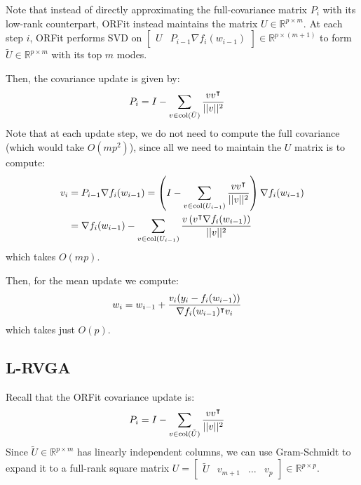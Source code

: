 Note that instead of directly approximating the full-covariance matrix $P_i$ with
its low-rank counterpart, ORFit instead maintains the matrix $U \in \mathbb{R}^{p \times m}$. At each step $i$,
ORFit performs SVD on $\begin{bmatrix} U & P_{i-1} \nabla f_i(w_{i-1}) \end{bmatrix} \in \mathbb{R}^{p \times (m+1)}$
to form $\tilde{U} \in \mathbb{R}^{p \times m}$ with its top $m$ modes.

Then, the covariance update is given by:
\begin{align}
    P_i &= I - \sum_{v \in \text{col}(\tilde{U})} \frac{v v^{\intercal}}{||v||^2}
\end{align}
Note that at each update step, we do not need to compute the full covariance 
(which would take $O(mp^2)$), since all we need to maintain the $U$ matrix is to compute:
\begin{align}
    v_i &= P_{i-1} \nabla f_i(w_{i-1}) = \left( I - \sum_{v \in \text{col}(U_{i-1})} \frac{v v^{\intercal}}{||v||^2} \right) \nabla f_i(w_{i-1}) \\
    &= \nabla f_i(w_{i-1}) - \sum_{v \in \text{col}(U_{i-1})} \frac{v \left(v^{\intercal}\nabla f_i(w_{i-1})\right)}{||v||^2}
\end{align}
which takes $O(mp)$.

Then, for the mean update we compute:
\begin{align}
    w_i &= w_{i-1} + \frac{v_i (y_i - f_i(w_{i-1}))}{\nabla f_i(w_{i-1})^{\intercal} v_i}
\end{align}
which takes just $O(p)$.

\subsection{L-RVGA}
Recall that the ORFit covariance update is:
\begin{align}
    P_i &= I - \sum_{v \in \text{col}(\tilde{U})} \frac{v v^{\intercal}}{||v||^2}
\end{align}
Since $\tilde{U} \in \mathbb{R}^{p \times m}$ has linearly independent columns, we can use Gram-Schmidt to expand it to a full-rank
square matrix $U = \begin{bmatrix} \tilde{U} & v_{m+1} & \dots & v_{p} \end{bmatrix} \in \mathbb{R}^{p \times p}$.

